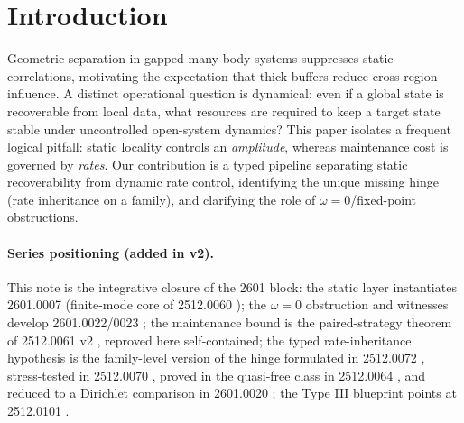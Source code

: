\documentclass[11pt]{article}
\theoremstyle{remark}
\begin{document}
\section{Introduction}
Geometric separation in gapped many-body systems suppresses static
correlations, motivating the expectation that thick buffers reduce
cross-region influence. A distinct operational question is dynamical: even
if a global state is recoverable from local data, what resources are
required to keep a target state stable under uncontrolled open-system
dynamics? This paper isolates a frequent logical pitfall: static locality
controls an \emph{amplitude}, whereas maintenance cost is governed by
\emph{rates}. Our contribution is a typed pipeline separating static
recoverability from dynamic rate control, identifying the unique missing
hinge (rate inheritance on a family), and clarifying the role of
$\omega = 0$/fixed-point obstructions.

\paragraph{Series positioning (added in v2).} This note is the integrative
closure of the 2601 block: the static layer instantiates 2601.0007
\cite{S0007} (finite-mode core of 2512.0060 \cite{S0060}); the
$\omega = 0$ obstruction and witnesses develop 2601.0022/0023
\cite{S0022, S0023}; the maintenance bound is the paired-strategy theorem
of 2512.0061 v2 \cite{S0061}, reproved here self-contained; the typed
rate-inheritance hypothesis is the family-level version of the hinge
formulated in 2512.0072 \cite{S0072}, stress-tested in 2512.0070
\cite{S0070}, proved in the quasi-free class in 2512.0064 \cite{S0064},
and reduced to a Dirichlet comparison in 2601.0020 \cite{S0020}; the
Type III blueprint points at 2512.0101 \cite{S0101}.
\end{document}
